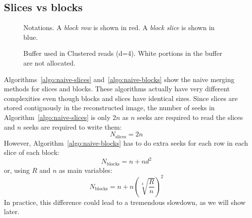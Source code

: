 \documentclass[10pt, conference, compsocconf]{IEEEtran}
\begin{document}
\subsection{Slices vs blocks}

\begin{figure}
  \centering
  \begin{minipage}[b]{0.42\columnwidth}
    \def\svgwidth{0.8\columnwidth}
    
    \caption{Notations. A \emph{block row} is shown in red. A
      \emph{block slice} is shown in blue.}
    \label{fig:notations}
  \end{minipage}
  \quad \quad \quad
  \begin{minipage}[b]{0.42\columnwidth}
    \def\svgwidth{0.8\columnwidth}
    
    \caption{Buffer used in Clustered reads (d=4).  White portions in
      the buffer are not allocated. }
    \label{fig:cluster-reads-buffer}
  \end{minipage}
\end{figure}
Algorithms~\ref{algo:naive-slices} and~\ref{algo:naive-blocks} show
the naive merging methods for slices and blocks. These algorithms
actually have very different complexities even though blocks and
slices have identical sizes. Since slices are stored contiguously in
the reconstructed image, the number of seeks in
Algorithm~\ref{algo:naive-slices} is only $2n$ as $n$ seeks are
required to read the slices and $n$ seeks are required to write them:
\begin{equation}
  N_\mathrm{slices} = 2n \label{eq:naive-blocks}
\end{equation}
However,
Algorithm~\ref{algo:naive-blocks} has to do extra seeks for each row
in each slice of each block:
\begin{equation*}
N_\mathrm{blocks} = n+nd^2  
\end{equation*}
or, using $R$ and $n$ as main variables:
\begin{equation}
N_\mathrm{blocks} = n+n\left(\sqrt[3]{\frac{R}{n}}\right)^2 \label{eq:naive-slices}
\end{equation}
In practice, this difference could lead to a tremendous slowdown, as
we will show later.
\end{document}
